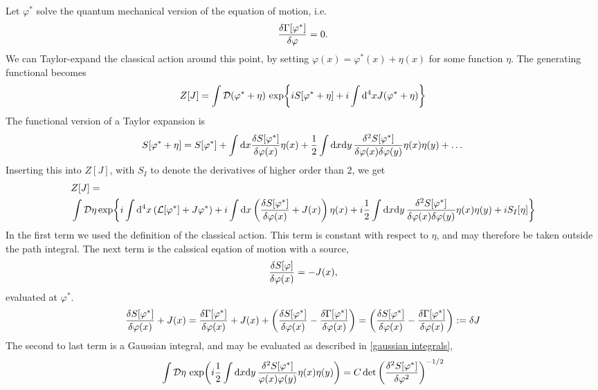 Let $\varphi^*$ solve the quantum mechanical version of the equation of motion, i.e.
\begin{equation}
    \fdv{\Gamma[\varphi^*]}{\varphi} = 0.
\end{equation}
We can Taylor-expand the classical action around this point, by setting $\varphi(x) = \varphi^*(x) + \eta(x)$ for some function $\eta$.
The generating functional becomes
\begin{align}
    Z[J] 
    = \int \mathcal{D} (\varphi^* + \eta) \, 
    \exp{i S[\varphi^* + \eta] + i \int \dd^4 x J (\varphi^* + \eta) }
\end{align}
The functional version of a Taylor expansion is
\begin{equation}
    S[\varphi^* + \eta] = 
    S[\varphi^*]
    + \int \dd x \fdv{S[\varphi^*]}{\varphi(x)} \eta(x)
    + \frac{1}{2} \int \dd x \dd y\,  \frac{\delta^2 S[\varphi^*]}{\delta\varphi(x)\delta\varphi(y)} \eta(x) \eta(y)
    + \dots
\end{equation}
Inserting this into $Z[J]$, with $S_I$ to denote the derivatives of higher order than $2$, we get
\begin{align*}
    &Z[J] = \\ 
    &\int \D \eta  
    \exp{
        i \int \dd^4 x \left(  \Ell[\varphi^*] + J \varphi^*  \right)
        + i \int \dd x \left(  \fdv{S[\varphi^*]}{\varphi(x)} + J(x) \right) \eta(x)
        + i \frac{1}{2} \int \dd x \dd y\,  
        \frac{\delta^2 S[\varphi^*]}{\delta\varphi(x)\delta\varphi(y)} \eta(x) \eta(y) 
        + i S_I[\eta]
        }
\end{align*}
In the first term we used the definition of the classical action. This term is constant with respect to $\eta$, and may therefore be taken outside the path integral.
The next term is the calssical eqation of motion with a source, 
\begin{equation}
    \fdv{S[\varphi]}{\varphi(x)} = - J(x),
\end{equation} 
evaluated at $\varphi^*$.
\begin{equation}
    \fdv{S[\varphi^*]}{\varphi(x)} + J(x)
    = \fdv{\Gamma[\varphi^*]}{\varphi(x)} + J(x)
    + \left(\fdv{S[\varphi^*]}{\varphi(x)} - \fdv{\Gamma[\varphi^*]}{\varphi(x)} \right)
    = \left(\fdv{S[\varphi^*]}{\varphi(x)} - \fdv{\Gamma[\varphi^*]}{\varphi(x)} \right)
    := \delta J
\end{equation}
The second to last term is a Gaussian integral, and may be evaluated as described in \autoref{gaussian integrals},
\begin{equation}
    \int \mathcal{D} \eta \, \exp(
        i \frac{1}{2} \int \dd x \dd y\,  
        \frac{\delta^2 S[\varphi^*]}{\varphi(x)\varphi(y)} \eta(x) \eta(y)
        )
        = C \det\left( \frac{\delta^2 S[\varphi^*]}{\delta \varphi^2} \right)^{-1/2}
\end{equation}
